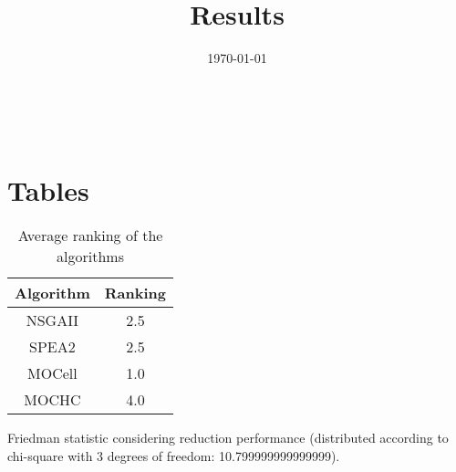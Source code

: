 \documentclass{article}
\title{Results}
\author{}
\date{\today}
\begin{document}
\oddsidemargin 0in \topmargin 0in\maketitle
\
\section{Tables}
\begin{table}[!htp]
\centering
\caption{Average ranking of the algorithms}
\begin{tabular}{c|c}
Algorithm&Ranking\\
\hline
NSGAII&2.5\\
SPEA2&2.5\\
MOCell&1.0\\
MOCHC&4.0\\
\end{tabular}
\end{table}


Friedman statistic considering reduction performance (distributed according to chi-square with 3 degrees of freedom: 10.799999999999999).
\end{document}
